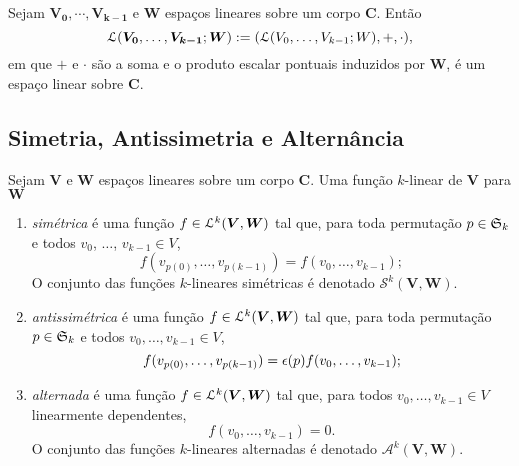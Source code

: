 \begin{prop}
Sejam $\bm{V_0},\cdots,\bm{V_{k-1}}$ e $\bm W$ espaços lineares sobre um corpo $\bm C$. Então
	\begin{equation*}
	\mathcal{L}(\bm{V_0},\ldots,\bm{V_{k-1}};\bm W) := (\mathcal{L}(V_0,\ldots,V_{k-1};W),+,\cdot),
	\end{equation*}	
em que $+$ e $\cdot$ são a soma e o produto escalar pontuais induzidos por $\bm W$, é um espaço linear sobre $\bm C$.
\end{prop}


\subsection{Simetria, Antissimetria e Alternância}

\begin{defi}
Sejam $\bm V$ e $\bm W$ espaços lineares sobre um corpo $\bm C$. Uma função $k$-linear de $\bm V$ para $\bm W$
\begin{enumerate}
	\item \emph{simétrica} é uma função $f \in \mathcal{L}^k(\bm V,\bm W)$ tal que, para toda permutação $p \in \mathfrak{S}_k$ e todos $v_0$, $\ldots$, $v_{k-1} \in V$,
	\begin{equation*}
	f(v_{p(0)},\ldots,v_{p(k-1)}) = f(v_0,\ldots,v_{k-1});
	\end{equation*}
O conjunto das funções $k$-lineares simétricas é denotado $\mathcal S^k(\bm V,\bm W)$.
	\item \emph{antissimétrica} é uma função $f \in \mathcal{L}^k(\bm V,\bm W)$ tal que, para toda permutação $p \in \mathfrak{S}_k$ e todos $v_0,\ldots,v_{k-1} \in V$,
	\begin{equation*}
	f(v_{p(0)},\ldots,v_{p(k-1)}) = \epsilon(p) f(v_0,\ldots,v_{k-1});
	\end{equation*}
	\item \emph{alternada} é uma função $f \in \mathcal{L}^k(\bm V,\bm W)$ tal que, para todos $v_0,\ldots,v_{k-1} \in V$ linearmente dependentes,
	\begin{equation*}
	f(v_0,\ldots,v_{k-1}) = 0.
	\end{equation*}
O conjunto das funções $k$-lineares alternadas é denotado $\mathcal A^k(\bm V,\bm W)$.
\end{enumerate}
\end{defi}

